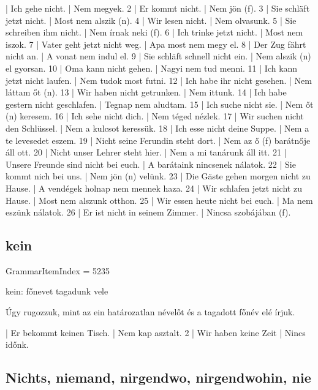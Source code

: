 \documentclass{article}
\newenvironment{desc}{\verbatim}{\endverbatim}
\newenvironment{exmp}{\verbatim}{\endverbatim}
\begin{document}
\begin{exmp}
1 | Ich gehe nicht. | Nem megyek.
2 | Er kommt nicht. | Nem jön (f).
3 | Sie schläft jetzt nicht. | Most nem alszik (n).
4 | Wir lesen nicht. | Nem olvasunk.
5 | Sie schreiben ihm nicht. | Nem írnak neki (f).
6 | Ich trinke jetzt nicht. | Most nem iszok.
7 | Vater geht jetzt nicht weg. | Apa most nem megy el.
8 | Der Zug fährt nicht an. | A vonat nem indul el.
9 | Sie schläft schnell nicht ein. | Nem alszik (n) el gyorsan.
10 | Oma kann nicht gehen. | Nagyi nem tud menni.
11 | Ich kann jetzt nicht laufen. | Nem tudok most futni.
12 | Ich habe ihr nicht gesehen. | Nem láttam őt (n).
13 | Wir haben nicht getrunken. | Nem ittunk.
14 | Ich habe gestern nicht geschlafen. | Tegnap nem aludtam.
15 | Ich suche nicht sie. | Nem őt (n) keresem.
16 | Ich sehe nicht dich. | Nem téged nézlek.
17 | Wir suchen nicht den Schlüssel. | Nem a kulcsot keressük.
18 | Ich esse nicht deine Suppe. | Nem a te levesedet eszem.
19 | Nicht seine Ferundin steht dort. | Nem az ő (f) barátnője áll ott.
20 | Nicht unser Lehrer steht hier. | Nem a mi tanárunk áll itt.
21 | Unsere Freunde sind nicht bei euch. | A barátaink nincsenek nálatok.
22 | Sie kommt nich bei uns. | Nem jön (n) velünk.
23 | Die Gäste gehen morgen nicht zu Hause. | A vendégek holnap nem mennek haza.
24 | Wir schlafen jetzt nicht zu Hause. | Most nem alszunk otthon.
25 | Wir essen heute nicht bei euch. | Ma nem eszünk nálatok.
26 | Er ist nicht in seinem Zimmer. | Nincsa szobájában (f).
\end{exmp}

\subsection{kein}

GrammarItemIndex = 5235

\begin{desc}
kein: főnevet tagadunk vele

Úgy rugozzuk, mint az ein határozatlan névelőt és a tagadott főnév elé írjuk.
\end{desc}

\begin{exmp}
1 | Er bekommt keinen Tisch. | Nem kap asztalt.
2 | Wir haben keine Zeit | Nincs időnk.
\end{exmp}

\subsection{Nichts, niemand, nirgendwo, nirgendwohin, nie}
\end{document}
